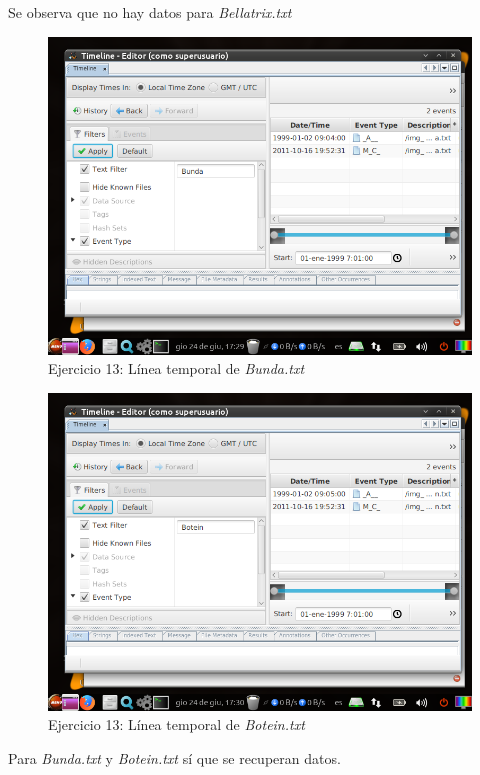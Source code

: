\documentclass[11pt]{article}
\begin{document}
Se observa que no hay datos para \textit{Bellatrix.txt}

\begin{figure}[H]
    \caption{Ejercicio 13: Línea temporal de \textit{Bunda.txt}}
    \centering
    \includegraphics[scale=0.7]{e13-9.png}
\end{figure}

\begin{figure}[H]
    \caption{Ejercicio 13: Línea temporal de \textit{Botein.txt}}
    \centering
    \includegraphics[scale=0.7]{e13-10.png}
\end{figure}

Para \textit{Bunda.txt} y \textit{Botein.txt} sí que se recuperan datos.



\begin{thebibliography}{8}
\end{thebibliography}
\end{document}
